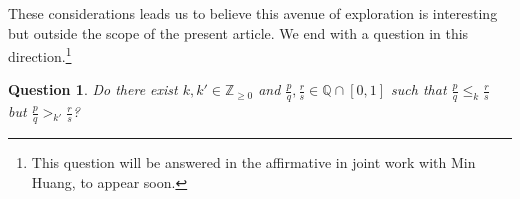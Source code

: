 \documentclass[12pt, letterpaper,table]{amsart}
\newtheorem{quest}[theorem]{Question}
\theoremstyle{remark}
\newcommand{\fpq}{\frac{p}{q}}
\newcommand{\frs}{\frac{r}{s}}
\begin{document}
These considerations leads us to believe this avenue of exploration is interesting but outside the scope of the present article. We end with a question in this direction.\footnote{This question will be answered in the affirmative in joint work with Min Huang, to appear soon.}

\begin{quest}\label{quest:AreTheyDifferent}
Do there exist $k,k' \in \mathbb{Z}_{\geq 0}$ and $\fpq,\frs \in \mathbb{Q} \cap [0,1]$ such that $\fpq \leq_k \frs$ but $\fpq >_{k'} \frs$?
\end{quest}





\end{document}
